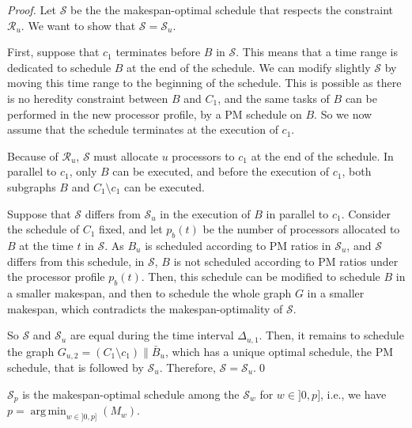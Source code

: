 \documentclass{llncs}
\newcommand{\para}[2]{#1 \mathop{\parallel} #2}
\newcommand{\s}{\mathcal S\xspace}
\newcommand{\R}{\ensuremath{\mathcal{R}}\xspace}
\DeclareMathOperator*{\argmin}{arg\,min}
\begin{document}
\begin{proof}
Let $\s$ be the the makespan-optimal schedule that respects the constraint $\R_u$. We want to show that $\s= \s_u$.

First, suppose that $c_1$ terminates before $B$ in $\s$. This means that a time range is dedicated to schedule $B$ at the end of the schedule. We can modify slightly $\s$ by moving this time range to the beginning of the schedule. This is possible as there is no heredity constraint between $B$ and $C_1$, and the same tasks of $B$ can be performed in the new processor profile, by a PM schedule on $B$. So we now assume that the schedule terminates at the execution of $c_1$.

Because of $\R_u$, $\s$ must allocate $u$ processors to $c_1$ at the end of the schedule. In parallel to $c_1$, only $B$ can be executed, and before the execution of $c_1$, both subgraphs $B$ and $C_1\setminus c_1$ can be executed.

Suppose that $\s$ differs from $\s_u$ in the execution of $B$ in parallel to $c_1$. Consider the schedule of $C_1$ fixed, and let $p_b(t)$ be the number of processors allocated to $B$ at the time $t$ in $\s$. As $B_u$ is scheduled according to PM ratios in $\s_u$, and $\s$ differs from this schedule, in $\s$, $B$ is not scheduled according to PM ratios under the processor profile $p_b(t)$. Then, this schedule can be modified to schedule $B$ in a smaller makespan, and then to schedule the whole graph $G$ in a smaller makespan, which contradicts the makespan-optimality of $\s$.

So $\s$ and $\s_u$ are equal during the time interval $\Delta_{u,1}$. Then, it remains to schedule the graph $G_{u,2}=\para{\left(C_1\setminus c_1\right)}{\bar B_u}$, which has a unique optimal schedule, the PM schedule, that is followed by $\s_u$. Therefore, $\s=\s_u$.\qed
\end{proof} 
 

\begin{lemma}
\label{lem:uopt}
$\s_p$ is the makespan-optimal schedule among the $\s_w$ for $w\in]0,p]$, i.e., we have $p=\argmin_{w\in]0,p]}\left(M_w\right)$.

\end{lemma}
\end{document}
